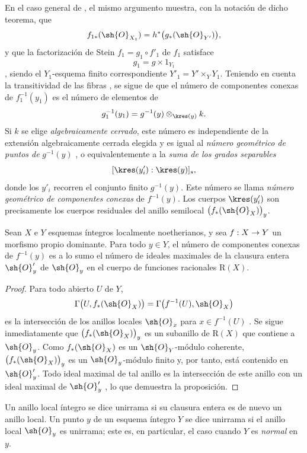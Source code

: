 \documentclass[oneside]{amsart}
\makeatletter
\newcommand{\ega@arrow}[2]{\mathchoice{#1}{#2}{#2}{#2}}
\renewcommand{\to}{\ega@arrow{\longrightarrow}{\rightarrow}}
\let\EGAOriginalLabel\label
\renewcommand{\label}[1]{\phantomsection\EGAOriginalLabel{#1}}
\makeatother
\begin{document}
\begin{remark}[4.3.4]
En el caso general de , el mismo argumento muestra,
con la notación de dicho teorema, que
\[
  f_{1*}(\sh{O}_{X_1})
  =
  h^*\bigl(g_*(\sh{O}_{Y'})\bigr),
\]
y que la factorización de Stein $f_1=g_1\circ f'_1$ de $f_1$
satisface
\[
  g_1=g\times 1_{Y_1}
\]
, siendo el $Y_1$-esquema finito correspondiente
$Y'_1=Y'\times_Y Y_1$. Teniendo en cuenta la transitividad de las
fibras , se sigue de
 que el número de componentes conexas de
$f_1^{-1}(y_1)$ es el número de elementos de
\[
  g_1^{-1}(y_1)
  =
  g^{-1}(y)\otimes_{\kres(y)}k.
\]
Si $k$ se elige \emph{algebraicamente cerrado}, este número es independiente
de la extensión algebraicamente cerrada elegida y es igual al
\emph{número geométrico de puntos de} $g^{-1}(y)$
, o equivalentemente a la
\emph{suma de los grados separables}
\[
  [\kres(y'_i):\kres(y)]_s,
\]
donde los $y'_i$ recorren el conjunto finito $g^{-1}(y)$. Este número
se llama \emph{número geométrico de componentes conexas} de
$f^{-1}(y)$. Los cuerpos $\kres(y'_i)$ son precisamente los cuerpos
residuales del anillo semilocal $\bigl(f_*(\sh{O}_X)\bigr)_y$.
\end{remark}

\begin{proposition}[4.3.5]
\label{III.4.3.5}
Sean $X$ e $Y$ esquemas íntegros localmente noetherianos, y sea
$f:X\to Y$ un morfismo propio dominante. Para todo $y\in Y$, el
número de componentes conexas de $f^{-1}(y)$ es a lo sumo el número
de ideales maximales de la clausura entera $\sh{O}'_y$ de
$\sh{O}_y$ en el cuerpo de funciones racionales $\mathrm{R}(X)$.
\end{proposition}

\begin{proof}
Para todo abierto $U$ de $Y$,
\[
  \Gamma\bigl(U,f_*(\sh{O}_X)\bigr)
  =
  \Gamma\bigl(f^{-1}(U),\sh{O}_X\bigr)
\]
es la intersección de los anillos locales $\sh{O}_x$ para
$x\in f^{-1}(U)$ . Se sigue inmediatamente que
$\bigl(f_*(\sh{O}_X)\bigr)_y$ es un subanillo de $\mathrm{R}(X)$ que
contiene a $\sh{O}_y$. Como $f_*(\sh{O}_X)$ es un
$\sh{O}_Y$-módulo coherente, $\bigl(f_*(\sh{O}_X)\bigr)_y$ es un
$\sh{O}_y$-módulo finito y, por tanto, está contenido en $\sh{O}'_y$.
Todo ideal maximal de tal anillo es la intersección de este anillo con
un ideal maximal de $\sh{O}'_y$
\cite[vol.~I, pp.~257 and 259]{I-13}, lo que demuestra la proposición.
\end{proof}

\begin{definition}[4.3.6]
\label{III.4.3.6}
Un anillo local íntegro se dice unirrama si su clausura entera
es de nuevo un anillo local. Un punto $y$ de un esquema íntegro
$Y$ se dice unirrama si el anillo local $\sh{O}_y$ es
unirrama; este es, en particular, el caso cuando $Y$ es \emph{normal} en
$y$.
\end{definition}
\end{document}
